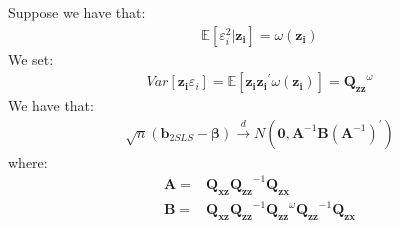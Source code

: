 \documentclass{article}
\begin{document}
Suppose we have that:
	\begin{align*}
		\mathbb{E}[\varepsilon^2_i | \boldsymbol{z_i}] = \omega(\boldsymbol{z_i})
	\end{align*}
We set:
	\begin{align*}
		Var[\boldsymbol{z_i} \varepsilon_i] = \mathbb{E}[\boldsymbol{z_i} \boldsymbol{z_i}^\prime \omega(\boldsymbol{z_i})] = \boldsymbol{Q_{zz}}^\omega
	\end{align*}
We have that:
	\begin{align*}
		\sqrt{n} (\boldsymbol{b}_{2SLS} - \boldsymbol{\beta}) \xrightarrow{d} N(\boldsymbol{0}, \boldsymbol{A}^{-1} \boldsymbol{B} (\boldsymbol{A}^{-1})^\prime)
	\end{align*}
where:
	\begin{align*}
		\boldsymbol{A} = & \boldsymbol{Q_{xz}} \boldsymbol{Q_{zz}}^{-1} \boldsymbol{Q_{zx}}\\
		\boldsymbol{B} = & \boldsymbol{Q_{xz}} \boldsymbol{Q_{zz}}^{-1} \boldsymbol{Q_{zz}}^\omega \boldsymbol{Q_{zz}}^{-1} \boldsymbol{Q_{zx}}
	\end{align*}
	
\end{document}
